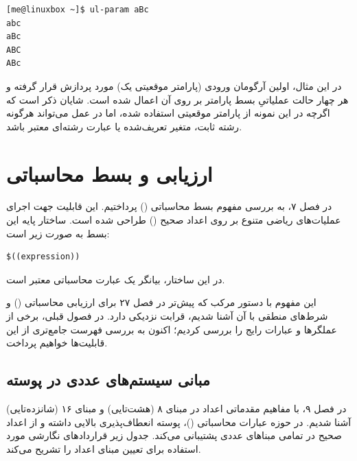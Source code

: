 \begin{latin}
\begin{lstlisting}
[me@linuxbox ~]$ ul-param aBc
abc
aBc
ABC
ABc
\end{lstlisting}
\end{latin}

در این مثال، اولین آرگومان ورودی (پارامتر موقعیتی یک) مورد پردازش قرار گرفته و هر چهار حالت عملیاتیِ بسط پارامتر بر روی آن اعمال شده است. شایان ذکر است که اگرچه در این نمونه از پارامتر موقعیتی استفاده شده، اما در عمل  می‌تواند هرگونه رشته ثابت، متغیر تعریف‌شده یا عبارت رشته‌ای معتبر باشد.

\section{ارزیابی و بسط محاسباتی}

در فصل ۷، به بررسی مفهوم بسط محاسباتی () پرداختیم. این قابلیت جهت اجرای عملیات‌های ریاضی متنوع بر روی اعداد صحیح () طراحی شده است. ساختار پایه این بسط به صورت زیر است:

\begin{latin}
\begin{lstlisting}
$((expression))
\end{lstlisting}
\end{latin}

در این ساختار،  بیانگر یک عبارت محاسباتی معتبر است.

این مفهوم با دستور مرکب \cmd{(( ))} که پیش‌تر در فصل ۲۷ برای ارزیابی محاسباتی () و شرط‌های منطقی با آن آشنا شدیم، قرابت نزدیکی دارد. در فصول قبلی، برخی از عملگرها و عبارات رایج را بررسی کردیم؛ اکنون به بررسی فهرست جامع‌تری از این قابلیت‌ها خواهیم پرداخت.

\subsection{مبانی سیستم‌های عددی در پوسته}

در فصل ۹، با مفاهیم مقدماتی اعداد در مبنای ۸ (هشت‌تایی) و مبنای ۱۶ (شانزده‌تایی) آشنا شدیم. در حوزه عبارات محاسباتی ()، پوسته  انعطاف‌پذیری بالایی داشته و از اعداد صحیح در تمامی مبناهای عددی پشتیبانی می‌کند. جدول زیر قراردادهای نگارشی مورد استفاده برای تعیین مبنای اعداد را تشریح می‌کند.

